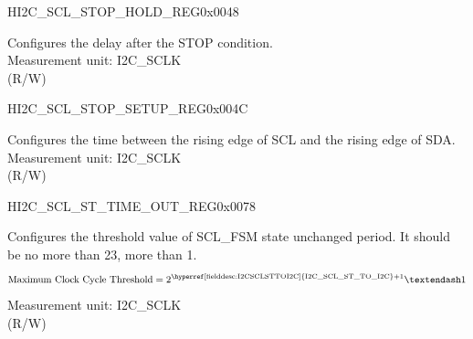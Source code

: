 \begin{register}{H}{I2C\_SCL\_STOP\_HOLD\_REG}{0x0048}\label{regdesc:I2CSCLSTOPHOLDREG}
%
%
\regnewline%
\begin{regdesc}\begin{reglist}
\label{fielddesc:I2CSCLSTOPHOLDTIME}\item [I2C\_SCL\_STOP\_HOLD\_TIME] Configures the delay after the STOP condition.\\
Measurement unit: I2C\_SCLK \\ (R/W)
\end{reglist}\end{regdesc}
\end{register}


\begin{register}{H}{I2C\_SCL\_STOP\_SETUP\_REG}{0x004C}\label{regdesc:I2CSCLSTOPSETUPREG}
%
%
\regnewline%
\begin{regdesc}\begin{reglist}
\label{fielddesc:I2CSCLSTOPSETUPTIME}\item [I2C\_SCL\_STOP\_SETUP\_TIME] Configures the time between the rising edge of SCL and the rising edge of SDA.\\
Measurement unit: I2C\_SCLK \\ (R/W)
\end{reglist}\end{regdesc}
\end{register}


\begin{register}{H}{I2C\_SCL\_ST\_TIME\_OUT\_REG}{0x0078}\label{regdesc:I2CSCLSTTIMEOUTREG}
%
%
\regnewline%
\begin{regdesc}\begin{reglist}
\label{fielddesc:I2CSCLSTTOI2C}\item [I2C\_SCL\_ST\_TO\_I2C] Configures the threshold value of SCL\_FSM state unchanged period. It should be no more than 23, more than 1.\\
\[
\text{Maximum Clock Cycle Threshold} = 2^{\text{\hyperref[fielddesc:I2CSCLSTTOI2C]{I2C\_SCL\_ST\_TO\_I2C}} + 1}–1
\]
Measurement unit: I2C\_SCLK \\ (R/W)
\end{reglist}\end{regdesc}
\end{register}


